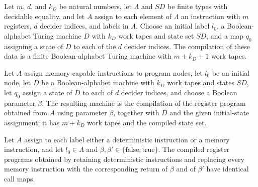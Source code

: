 \begin{definition}
\label{Complexity.LogProg.mcompileFinTM}
\leanok
{}
Let $m$, $d$, and $k_D$ be natural numbers, let $\Lambda$ and $SD$ be finite types with
decidable equality, and let $A$ assign to each element of $\Lambda$ an instruction with
$m$ registers, $d$ decider indices, and labels in $\Lambda$. Choose an initial label
$l_0$, a Boolean-alphabet Turing machine $D$ with $k_D$ work tapes and state set $SD$,
and a map $q_0$ assigning a state of $D$ to each of the $d$ decider indices. The
compilation of these data is a finite Boolean-alphabet Turing machine with $m+k_D+1$
work tapes.
\end{definition}

\begin{definition}
\label{Complexity.LogProg.detM}
\leanok
{}
Let $A$ assign memory-capable instructions to program nodes, let $l_0$ be an initial
node, let $D$ be a Boolean-alphabet machine with $k_D$ work tapes and states $SD$, let
$q_0$ assign a state of $D$ to each of $d$ decider indices, and choose a Boolean
parameter $\beta$. The resulting machine is the compilation of the register program
obtained from $A$ using parameter $\beta$, together with $D$ and the given initial-state
assignment; it has $m+k_D$ work tapes and the compiled state set.
\end{definition}

\begin{lemma}
\label{Complexity.LogProg.armProg_mdetPart_call}
\leanok
{}
Let $A$ assign to each label either a deterministic instruction or a memory instruction,
and let $l_0\in\Lambda$ and $\beta,\beta'\in\{\mathrm{false},\mathrm{true}\}$. The
compiled register programs obtained by retaining deterministic instructions and
replacing every memory instruction with the corresponding return of $\beta$ and of
$\beta'$ have identical call maps.
\end{lemma}

